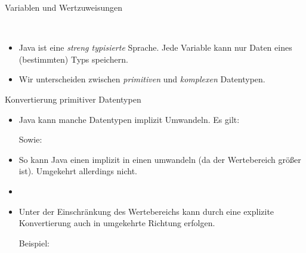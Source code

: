 \begin{frame}{Variablen und Wertzuweisungen}
    \pause{}
    \begin{center}
        \parbox{7cm}{\!\\
        }
    \end{center}
    \begin{itemize}[<+(1)->]
        \widei
        \item Java ist eine \emph{streng typisierte} Sprache.\pause{} Jede Variable kann nur Daten eines (bestimmten) Typs speichern.
        \item Wir unterscheiden zwischen \emph{primitiven} und \emph{komplexen} Datentypen. 
    \end{itemize}
\end{frame}

\begin{frame}{Konvertierung primitiver Datentypen}
    \begin{itemize}[<+(1)->]
        \widei
        \item Java kann manche Datentypen implizit Umwandeln.\pause{} Es gilt:\pause{}
        \begin{center}
             \mprec{}  \mprec{}  \mprec{}  \mprec{}  \mprec{} 
        \end{center}
        \pause{}Sowie:\pause{}
        \begin{center}
             \mprec{} 
        \end{center}
        \item So kann Java einen  implizit in einen  umwandeln\pause{} (da der Wertebereich größer ist).\pause{} Umgekehrt allerdings nicht.
        \item {}
        \item Unter der Einschränkung des Wertebereichs kann durch  eine explizite Konvertierung auch in umgekehrte Richtung erfolgen.\par
        \pause{}Beispiel: 
    \end{itemize}
\end{frame}


